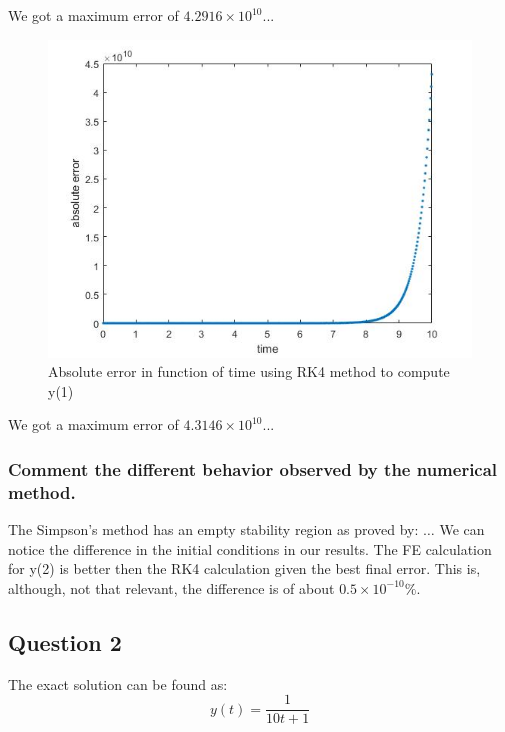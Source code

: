 \documentclass[a4paper, 11pt]{article}
\begin{document}
	We got a maximum error of $4.2916 \times 10^{10}$...
	
	\begin{figure}[H]
		\centering
		\includegraphics[width=\linewidth]{ex1_rk4.jpg}
		\caption{Absolute error in function of time using RK4 method to compute y(1)}
		\label{fig:ex1_rk4}
	\end{figure}
	
	We got a maximum error of $4.3146 \times 10^{10}$...
	
	\subsubsection*{Comment the different behavior observed by the numerical method.}
		The Simpson's method has an empty stability region as proved by: $\ldots$
		We can notice the difference in the initial conditions in our results.
		The FE calculation for y(2) is better then the RK4 calculation given the best final error.
		This is, although, not that relevant, the difference is of about $ 0.5 \times 10^{-10} \% $.
	
	\subsection*{Question 2}
	
	The exact solution can be found as:
	\begin{equation}
		y(t) = \frac{1}{10t + 1}
	\end{equation}
	
\end{document}
